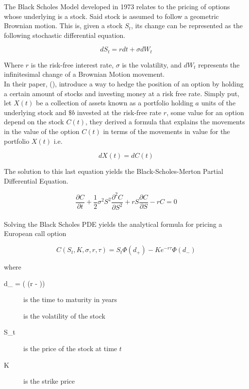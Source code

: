 \documentclass{article}
\newcommand{\Mycite}[1]{%
 \citeauthor{#1}(\citeyear{#1})}
\begin{document}
The Black Scholes Model developed in 1973 relates to the pricing of options whose underlying is a stock. Said stock is assumed to follow a geometric Brownian motion. This is, given a stock $S_t$, its change can be represented as the following stochastic differential equation.

\begin{equation}
    dS_t = r dt + \sigma dW_t 
\end{equation}

Where $r$ is the risk-free interest rate, $\sigma$ is the volatility, and $dW_t$ represents the infinitesimal change of a Brownian Motion movement.\\

In their paper, \Mycite{black_scholes}, introduce a way to hedge the position of an option by holding a certain amount of stocks and investing money at a risk free rate. Simply put, let $X(t)$ be a collection of assets known as a portfolio holding $a$ units of the underlying stock and $\$b$ invested at the risk-free rate $r$, some value for an option depend on the stock $C(t)$, they derived a formula that explains the movements in the value of the option $C(t)$ in terms of the movements in value for the portfolio $X(t)$ i.e.

\begin{equation}
    dX(t) = dC(t)
\end{equation}

The solution to this last equation yields the Black-Scholes-Merton Partial Differential Equation.

\begin{equation}
    \frac{\partial C}{\partial t} + \frac{1}{2}\sigma^2 S^2 \frac{\partial^2 C}{\partial S^2} + rS\frac{\partial C}{\partial S} - rC = 0  
\end{equation}\\


Solving the Black Scholes PDE yields the analytical formula for pricing a European call option

\begin{equation}
    C(S_t,  K, \sigma, r, \tau) = S_t \Phi(d_+) - Ke^{-r\tau}\Phi(d_-)
\end{equation}

where
\begin{description}
	\item[d_{\pm} = \left(\log{} \pm (r - )\tau\right)]
    \item[\tau] is the time to maturity in years
    \item[\sigma] is the volatility of the stock
    \item[S_t] is the price of the stock at time $t$
    \item[K] is the strike price
\end{description}
\end{document}
